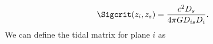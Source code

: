 \begin{equation}
\Sigcrit(z_i, z_s) = \frac{c^2 D_s}{4 \pi G D_{is} D_i}.
\end{equation}
We can define the tidal matrix for plane $i$ as